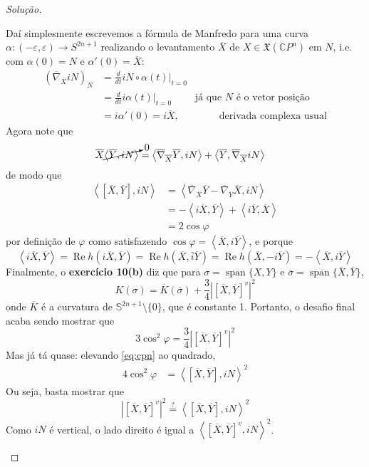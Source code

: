 \begin{proof}[Solução]
\begin{enumerate}[label=(\alph*)]
	Daí simplesmente escrevemos a fórmula de Manfredo para uma curva \(\alpha:(-\varepsilon,\varepsilon)\to S^{2n+1}\) realizando o levantamento \(\overline{X}\) de \(X \in \mathfrak{X}(\mathbb{C}P^{n})\) em \(N\), i.e. com \(\alpha(0)=N\) e \(\alpha'(0)=\overline{X}\):
	\begin{align*}
		(\overline{\nabla}_{\overline{X}}i N)_N&=\frac{d}{dt}i N \circ \alpha(t)\Big|_{t=0}\\
		&=\frac{d}{dt}i \alpha(t)\Big|_{t=0}\qquad  \text{ já que \(N\) é o vetor posição} \\
		&=i \alpha'(0)=i\overline{X}, \qquad \qquad \text{derivada complexa usual} 
	\end{align*}
	Agora note que
	\begin{align*}
	\overline{X}\cancelto{0}{\left<\overline{Y},iN\right>}&=\left<\overline{\nabla}_{\overline{X}}\overline{Y},i N\right>+\left<\overline{Y},\overline{\nabla}_{\overline{X}}i N\right>
	\end{align*}
	de modo que
	\begin{equation}\label{eq:cpn}
		\begin{aligned}
	\left<[\overline{X},\overline{Y}],i N\right>&=\left<\overline{\nabla}_{\overline{X}}\overline{Y}-\overline{\nabla}_{\overline{Y}}\overline{X},i N\right>\\
	&=-\left<i \overline{X},\overline{Y}\right>+\left<i \overline{Y},\overline{X}\right>\\
	&=2 \cos \varphi\end{aligned}
	\end{equation}
por definição de \(\varphi\) como satisfazendo \(\cos \varphi=\left<\overline{X},i \overline{Y}\right>\), e porque \[\left<i \overline{X},\overline{Y}\right>=\operatorname{Re}h(i\overline{X},\overline{Y})=\operatorname{Re}h(\overline{X},\bar{i} \overline{Y} )=\operatorname{Re}h(\overline{X},-i \overline{Y} )=-\left<\overline{X},i \overline{Y}\right>\]
Finalmente, o \textbf{exercício 10(b)} diz que para \(\sigma=\operatorname{span}\{X,Y\}\) e \(\overline{\sigma}=\operatorname{span}\{\overline{X}, \overline{Y}\}\),
\[\boxed{K(\sigma)=\overline{K}(\overline{\sigma})+\frac{3}{4}\left|\left[ \overline{X},\overline{Y} \right]^v\right|^2}\]
onde \(\overline{K}\) é a curvatura de \(\mathbb{S}^{2n+1}\setminus\{0\}\), que é constante 1. Portanto, o desafio final acaba sendo mostrar que
\[3 \cos^2 \varphi=\frac{3}{4}\left|\left[ \overline{X},\overline{Y} \right]^v\right|^2\]
Mas já tá quase: elevando \cref{eq:cpn} ao quadrado,
\begin{align*}
4\cos^2\varphi&=\left<\left[ \overline{X},\overline{Y} \right] ,i N\right>^2
\end{align*}
Ou seja, basta mostrar que
\[\left|\left[ \overline{X},\overline{Y} \right]^v\right|^2\overset{?}{=}\left<\left[ \overline{X},\overline{Y} \right],i N\right>^2\]
Como \(i N\) é vertical, o lado direito é igual a \(\left<\left[ \overline{X},\overline{Y} \right]^v, iN\right>^2\).


\end{enumerate}
\end{proof}
